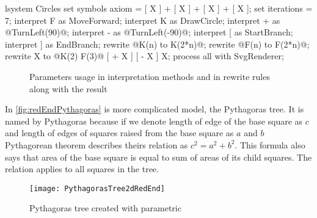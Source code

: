 \newsavebox{\lstBox}
\begin{lrbox}{\lstBox}
\begin{Lsystem50}
lsystem Circles {
	set symbols axiom =	[ X ] +
		[ X ] + [ X ] + [ X ];
	set iterations = 7;
	interpret F as MoveForward;
	interpret K as DrawCircle;
	interpret + as @TurnLeft(90)@;
	interpret - as @TurnLeft(-90)@;
	interpret [ as StartBranch;
	interpret ] as EndBranch;
	rewrite @K(n) to K(2*n)@;
	rewrite @F(n) to F(2*n)@;
	rewrite X to @K(2) F(3)@
		[ + X ] [ - X ] X;
}
process all with SvgRenderer;
\end{Lsystem50}
\end{lrbox}

\begin{figure}[h!]
	\subfloat{
		\usebox{\lstBox}
	} \hfill
	\caption{Parameters usage in \lsystem interpretation methods and in rewrite rules along with the result}
	\label{fig:scParams}
\end{figure}

In \autoref{fig:redEndPythagoras} is more complicated model, the Pythagoras tree.
It is named by Pythagoras because if we denote length of edge of the base square as $c$ and length of edges of squares raised from the base square as $a$ and $b$ Pythagorean theorem describes theirs relation as $c^2 = a^2 + b^2$.
This formula also says that area of the base square is equal to sum of areas of its child squares.
The relation applies to all squares in the tree.

\begin{figure}[H]
	\centering
	\texttt{[image: PythagorasTree2dRedEnd]}
	\caption{Pythagoras tree created with parametric \lsystem}
	\label{fig:redEndPythagoras}
\end{figure}
































